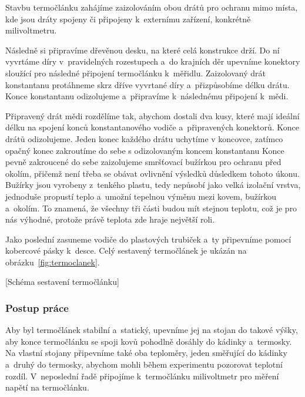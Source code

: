 Stavbu termočlánku zahájíme zaizolováním obou drátů pro ochranu mimo místa, kde
jsou dráty spojeny či připojeny k~externímu zařízení, konkrétně milivoltmetru.

Následně si připravíme dřevěnou desku, na které celá konstrukce drží.
Do ní vyvrtáme díry v~pravidelných rozestupech a~do krajních děr upevníme
konektory sloužící pro následné připojení termočlánku k~měřidlu. Zaizolovaný
drát konstantanu protáhneme skrz dříve vyvrtané díry a~přizpůsobíme
délku drátu. Konce konstantanu odizolujeme a~připravíme k~následnému
připojení k~mědi.

Připravený drát mědi rozdělíme tak, abychom dostali dva kusy, které mají
ideální délku na spojení konců konstantanového vodiče a~připravených konektorů.
Konce drátů odizolujeme. Jeden konec každého drátu uchytíme v koncovce, zatímco
opačný konec zakroutíme do sebe s odizolovaným koncem konstantanu%
Konce pevně zakroucené do sebe zaizolujeme smršťovací bužírkou pro ochranu
před okolím,
přičemž není třeba se obávat ovlivnění výsledků důsledkem tohoto úkonu. Bužírky
jsou vyrobeny z~tenkého plastu, tedy nepůsobí jako velká izolační vrstva,
jednoduše propustí teplo a~umožní tepelnou výměnu mezi kovem, bužírkou
a~okolím. To znamená, že všechny tři části budou mít stejnou teplotu, což je
pro nás výhodné, protože právě teplota zde hraje největší roli.

Jako poslední zasuneme vodiče do plastových trubiček a~ty připevníme pomocí
kobercové pásky k~desce. Celý sestavený termočlánek je ukázán na
obrázku~\ref{fig:termoclanek}.

[Schéma sestavení termočlánku]

\subsubsection{Postup práce}
Aby byl termočlánek stabilní a~statický, upevníme jej na stojan do takové
výšky, aby konce termočlánku se spoji kovů pohodlně dosáhly do kádinky
a~termosky. Na vlastní stojany připevníme také oba teploměry, jeden
směřující do kádinky a~druhý do termosky, abychom mohli během experimentu
pozorovat teplotní rozdíl. V~neposlední řadě připojíme k~termočlánku
milivoltmetr pro měření napětí na termočlánku. 

